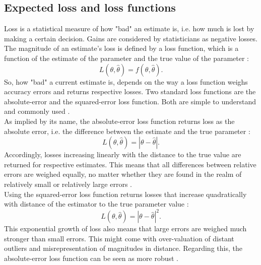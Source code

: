         \subsection{Expected loss and loss functions}\label{sec:loss} 
        Loss is a statistical measure of how "bad" an estimate is, i.e. how much is lost by making a certain decision. Gains are considered by statisticians as negative losses.
        The magnitude of an estimate's loss is defined by a loss function, which is a function of the estimate of the parameter and the true value of the parameter \citep{davidson2015}:        
        \begin{equation}\label{eq:LossFunction}
        L(\theta,\hat{\theta}) = f(\theta,\hat{\theta}).
        \end{equation}        
        So, how "bad" a current estimate is, depends on the way a loss function weighs accuracy errors and returns respective losses. Two standard loss functions are the absolute-error and the squared-error loss function. Both are simple to understand and commonly used \citep{davidson2015}.\\        
        As implied by its name, the absolute-error loss function returns loss as the absolute error, i.e. the difference between the estimate and the true parameter \citep{davidson2015}:        
        \begin{equation}\label{eq:AbsLossFunction}
        L(\theta,\hat{\theta}) = |\theta - \hat{\theta}|.
        \end{equation}                
        Accordingly, losses increasing linearly with the distance to the true value are returned for respective estimates. This means that all differences between relative errors are weighed equally, no matter whether they are found in the realm of relatively small or relatively large errors \citep{hennig2007}.\\
        Using the squared-error loss function returns losses that increase quadratically with distance of the estimator to the true parameter value \citep{davidson2015}:        
        \begin{equation}\label{eq:SqrLossFunction}
        L(\theta,\hat{\theta}) = |\theta - \hat{\theta}|^2.
        \end{equation}         
        This exponential growth of loss also means that large errors are weighed much stronger than small errors. This might come with over-valuation of distant outliers and misrepresentation of magnitudes in distance. Regarding this, the absolute-error loss function can be seen as more robust \citep{davidson2015}.
